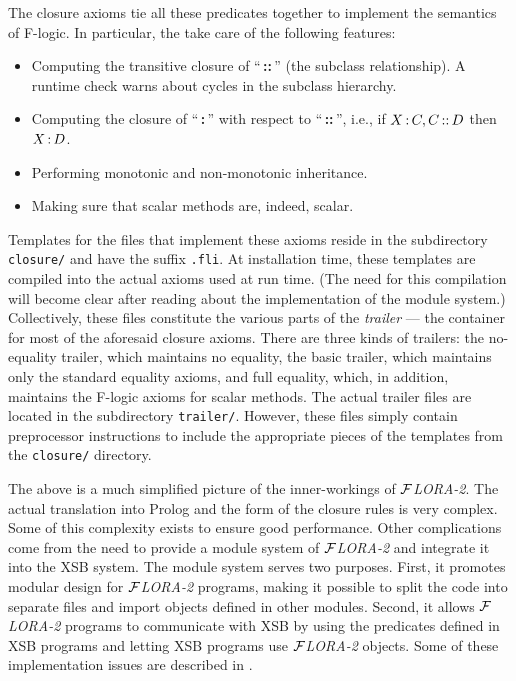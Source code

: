 \documentclass[11pt]{article}
\newcommand{\isa}{\,{\bf{:}}\,}
\newcommand{\subcl}{\,{\bf{::}}\,}
\newcommand{\FLORA}{{\mbox{${\cal F}${\small\it LORA}\rm\emph{-2}}}\xspace}
\newcommand{\fl}{\mbox{F-logic}\xspace}
\begin{document}
The closure axioms tie all these predicates together to implement the
semantics of \fl. In particular, the take care of the following features:
\begin{itemize}
\item Computing the transitive closure of ``\subcl'' (the subclass
  relationship).  A runtime check warns about cycles in the subclass
  hierarchy.
\item Computing the closure of ``\isa'' with respect to ``\subcl'', i.e.,
  if $X\isa C, C\subcl D$ then $X\isa D$.
\item Performing monotonic and non-monotonic inheritance.
\item Making sure that scalar methods are, indeed, scalar.
\end{itemize}
Templates for the files that implement these axioms reside in the
subdirectory \texttt{closure/} and have the suffix {\tt .fli}. At
installation time, these templates are compiled into the actual axioms used
at run time. (The need for this compilation will become clear after reading
about the implementation of the module system.)
Collectively, these files constitute the various parts of the
\emph{trailer} --- the container for most of the aforesaid closure axioms.
There are three kinds of trailers: the no-equality trailer, which maintains
no equality, the basic trailer, which maintains only the standard equality
axioms, and full equality, which, in addition, maintains the \fl axioms for
scalar methods. The actual trailer files are located in the subdirectory
{\tt trailer/}. However, these files simply contain preprocessor
instructions to include the appropriate pieces of the templates from the
{\tt closure/} directory.

The above is a much simplified picture of the inner-workings of \FLORA. The
actual translation into Prolog and the form of the closure rules is very
complex.  Some of this complexity exists to ensure good performance.  Other
complications come from the need to provide a module system of \FLORA and
integrate it into the XSB system.  The module system serves two purposes.
First, it promotes modular design for \FLORA programs, making it possible
to split the code into separate files and import objects defined in other
modules. Second, it allows \FLORA programs to communicate with XSB by using
the predicates defined in XSB programs and letting XSB programs use \FLORA
objects.  Some of these implementation issues are described in
\cite{guiz-flora-00}.
\end{document}
